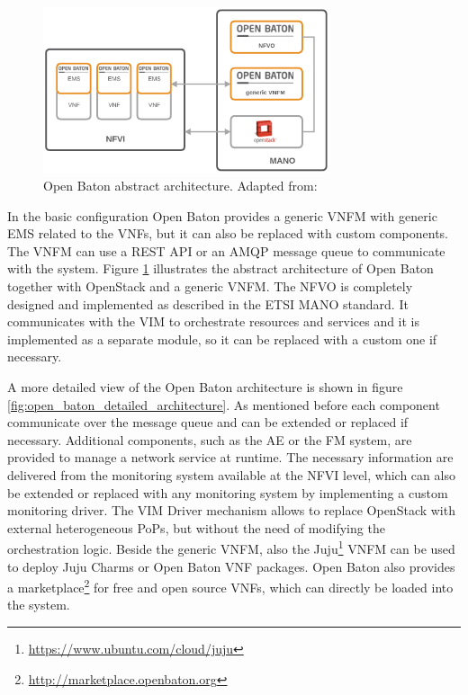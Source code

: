 \begin{figure}[H]
    \centering
    \includegraphics[width=0.75\textwidth]{resources/images/open_baton_simple_architecture.png}
    \caption[Open Baton abstract architecture]{Open Baton abstract architecture. Adapted from: \autocite{openBatonDoc}}
    \label{fig:open_baton_abstract_architecture}
\end{figure}

In the basic configuration Open Baton provides a generic \ac{VNFM} with generic \ac{EMS} related to the \acp{VNF}, but it can also be replaced with custom components.
The \ac{VNFM} can use a \ac{REST} \ac{API} or an \ac{AMQP} message queue to communicate with the system.
Figure \ref{fig:open_baton_abstract_architecture} illustrates the abstract architecture of Open Baton together with OpenStack and a generic \ac{VNFM}.
The \ac{NFVO} is completely designed and implemented as described in the \ac{ETSI} \ac{MANO} standard.\autocite{openBatonDoc}
It communicates with the \ac{VIM} to orchestrate resources and services and it is implemented as a separate module, so it can be replaced with a custom one if necessary.

A more detailed view of the Open Baton architecture is shown in figure \ref{fig:open_baton_detailed_architecture}.
As mentioned before each component communicate over the message queue and can be extended or replaced if necessary.
Additional components, such as the \ac{AE} or the \ac{FM} system, are provided to manage a network service at runtime.\autocite{openBatonDoc}
The necessary information are delivered from the monitoring system available at the \ac{NFVI} level, which can also be extended or replaced with any monitoring system by implementing a custom monitoring driver.\autocite{openBatonDoc}
The \ac{VIM} Driver mechanism allows to replace OpenStack with external heterogeneous \acp{PoP}, but without the need of modifying the orchestration logic.\autocite{openBatonDoc}
Beside the generic \ac{VNFM}, also the Juju\footnote{\url{https://www.ubuntu.com/cloud/juju}} \ac{VNFM} can be used to deploy Juju Charms or Open Baton \ac{VNF} packages.
Open Baton also provides a marketplace\footnote{\url{http://marketplace.openbaton.org}} for free and open source \acp{VNF}, which can directly be loaded into the system.

